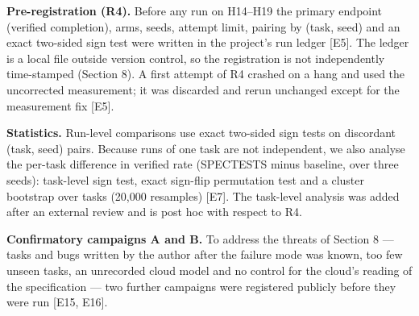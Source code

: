 \documentclass[11pt]{article}
\begin{document}
\textbf{Pre-registration (R4).} Before any run on H14–H19 the primary endpoint (verified completion), arms, seeds, attempt limit, pairing by (task, seed) and an exact two-sided sign test were written in the project's run ledger [E5]. The ledger is a local file outside version control, so the registration is not independently time-stamped (Section 8). A first attempt of R4 crashed on a hang and used the uncorrected measurement; it was discarded and rerun unchanged except for the measurement fix [E5].

\textbf{Statistics.} Run-level comparisons use exact two-sided sign tests on discordant (task, seed) pairs. Because runs of one task are not independent, we also analyse the per-task difference in verified rate (SPECTESTS minus baseline, over three seeds): task-level sign test, exact sign-flip permutation test and a cluster bootstrap over tasks (20,000 resamples) [E7]. The task-level analysis was added after an external review and is post hoc with respect to R4.

\textbf{Confirmatory campaigns A and B.} To address the threats of Section 8 — tasks and bugs written by the author after the failure mode was known, too few unseen tasks, an unrecorded cloud model and no control for the cloud's reading of the specification — two further campaigns were registered publicly before they were run [E15, E16].
\end{document}
